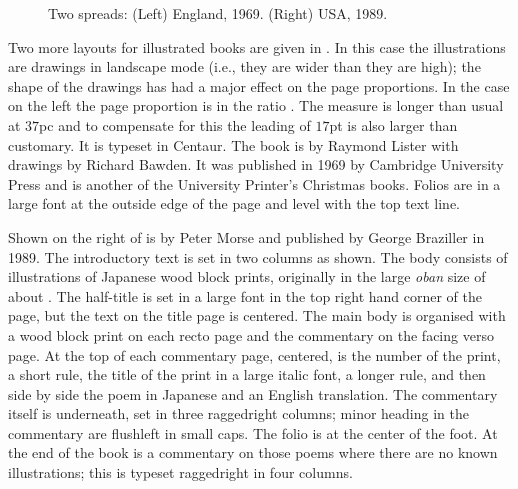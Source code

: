 \documentclass[10pt,a4paper,extrafontsizes]{memoir}
\begin{document}
\begin{figure}
\centering
\begin{minipage}[b]{\pwlayi}
\end{minipage}
\hfill
\begin{minipage}[b]{\pwlayi}
\end{minipage}
\caption[Two spreads: England, 1969 and USA 1989]%
        {Two spreads: (Left) England, 1969.
         (Right) USA, 1989.} \label{fb:16}
\end{figure}

\begin{paracol}{2}
\switchEng
    Two more layouts for illustrated books are given in .
In this case the illustrations are drawings in landscape 
mode (i.e., they are wider than they are high); the shape of the drawings 
has had a major effect on the page proportions. In the case on the left 
the page proportion is in the ratio . The measure is 
longer than usual at $37$pc and to compensate for this the leading of $17$pt 
is also larger than customary. It is typeset in Centaur.
The book is
 by Raymond Lister with drawings by Richard Bawden.
It was published in 1969 by Cambridge University 
Press and is another of
the University Printer's Christmas books. Folios
are in a large font at the outside edge of the page and level with the 
top text line.


Shown on the right of  is 
by Peter Morse and published by George Braziller in 1989. The introductory
text is set in two columns as shown. The body consists 
of illustrations of Japanese wood block prints, 
originally in the large \textit{oban} size of about .
The half-title 
is set in a large font in the top
right hand corner of the page, but the text on the title
page is centered. The main body is organised with a wood block print
on each recto page and the commentary on the facing verso page. At the
top of each commentary page, centered, is the number of the print, a short
rule, the title of the print in a large italic font, a longer rule,
and then side by side the poem in Japanese and an English translation.
The commentary itself is underneath, set in three raggedright 
columns; minor heading in the commentary are
flushleft in small caps. The folio is at the center
of the foot. At the end of the book is a commentary on
those poems where there are no known illustrations; this is typeset
raggedright in four columns.
\end{paracol}
\end{document}
